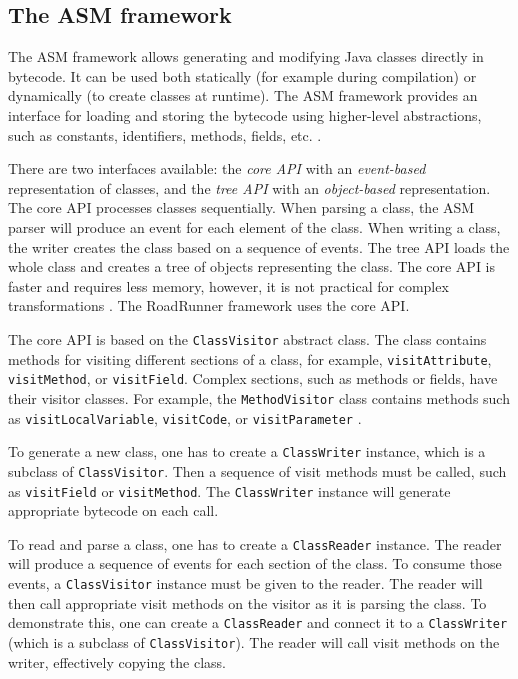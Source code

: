 
\subsection{The ASM framework}

The ASM framework allows generating and modifying Java classes directly in
bytecode. It can be used both statically (for example during compilation) or
dynamically (to create classes at runtime). The ASM framework provides an
interface for loading and storing the bytecode using higher-level abstractions,
such as constants, identifiers, methods, fields, etc. \cite{asmguide}.

There are two interfaces available: the \emph{core API} with an
\emph{event-based} representation of classes, and the \emph{tree API} with an
\emph{object-based} representation. The core API processes classes sequentially.
When parsing a class, the ASM parser will produce an event for each element of
the class.  When writing a class, the writer creates the class based on a
sequence of events. The tree API loads the whole class and creates a tree of
objects representing the class. The core API is faster and requires less memory,
however, it is not practical for complex transformations \cite{asmguide}. The
RoadRunner framework uses the core API.

The core API is based on the \texttt{ClassVisitor} abstract class. The class
contains methods for visiting different sections of a class, for example,
\texttt{visitAttribute}, \texttt{visitMethod}, or \texttt{visitField}. Complex
sections, such as methods or fields, have their visitor classes. For example,
the \texttt{MethodVisitor} class contains methods such as
\texttt{visitLocalVariable}, \texttt{visitCode}, or \texttt{visitParameter}
\cite{asmguide}.

To generate a new class, one has to create a \texttt{ClassWriter} instance,
which is a subclass of \texttt{ClassVisitor}. Then a sequence of visit methods
must be called, such as \texttt{visitField} or \texttt{visitMethod}. The
\texttt{ClassWriter} instance will generate appropriate bytecode on each call.

To read and parse a class, one has to create a \texttt{ClassReader} instance.
The reader will produce a sequence of events for each section of the class. To
consume those events, a \texttt{ClassVisitor} instance must be given to the
reader. The reader will then call appropriate visit methods on the visitor as it
is parsing the class. To demonstrate this, one can create a \texttt{ClassReader}
and connect it to a \texttt{ClassWriter} (which is a subclass of
\texttt{ClassVisitor}). The reader will call visit methods on the writer,
effectively copying the class.

